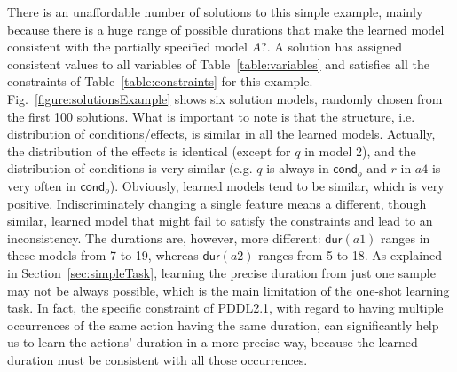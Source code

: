 \documentclass[10pt,journal,compsoc]{IEEEtran}
\newcommand{\cond}{\mathsf{cond}}  %
\newcommand{\dur}{\mathsf{dur}}    %
\begin{document}
There is an unaffordable number of solutions to this simple example, mainly because there is a huge range of possible durations that make the learned model consistent with the partially specified model $A?$. A solution has assigned consistent values to all variables of Table~\ref{table:variables} and satisfies all the constraints of Table~\ref{table:constraints} for this example.
Fig.~\ref{figure:solutionsExample} shows six solution models, randomly chosen from the first 100 solutions. What is important to note is that the structure, i.e. distribution of conditions/effects, is similar in all the learned models. Actually, the distribution of the effects is identical (except for $q$ in model 2), and the distribution of conditions is very similar (e.g. $q$ is always in $\cond_o$ and $r$ in $a4$ is very often in $\cond_o$). Obviously, learned models tend to be similar, which is very positive. Indiscriminately changing a single feature means a different, though similar, learned model that might fail to satisfy the constraints and lead to an inconsistency.
The durations are, however, more different: $\dur(a1)$ ranges in these models from 7 to 19, whereas $\dur(a2)$ ranges from 5 to 18. As explained in Section~\ref{sec:simpleTask}, learning the precise duration from just one sample may not be always possible, which is the main limitation of the one-shot learning task.
In fact, the specific constraint of PDDL2.1, with regard to having multiple occurrences of the same action having the same duration, can significantly help us to learn the actions' duration in a more precise way, because the learned duration must be consistent with all those occurrences.
\end{document}
